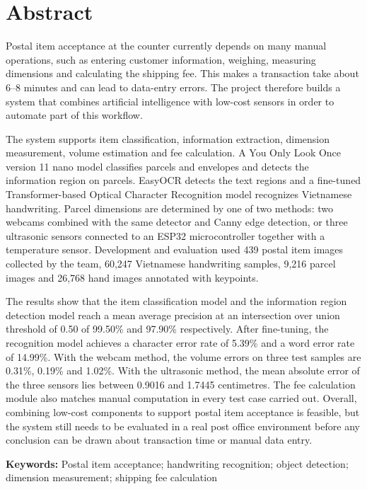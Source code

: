 \chapter*{Abstract}
\normalsize

Postal item acceptance at the counter currently depends on many manual operations, such as entering customer information, weighing, measuring dimensions and calculating the shipping fee. This makes a transaction take about 6--8 minutes and can lead to data-entry errors. The project therefore builds a system that combines artificial intelligence with low-cost sensors in order to automate part of this workflow.

The system supports item classification, information extraction, dimension measurement, volume estimation and fee calculation. A You Only Look Once version 11 nano model classifies parcels and envelopes and detects the information region on parcels. EasyOCR detects the text regions and a fine-tuned Transformer-based Optical Character Recognition model recognizes Vietnamese handwriting. Parcel dimensions are determined by one of two methods: two webcams combined with the same detector and Canny edge detection, or three ultrasonic sensors connected to an ESP32 microcontroller together with a temperature sensor. Development and evaluation used 439 postal item images collected by the team, 60,247 Vietnamese handwriting samples, 9,216 parcel images and 26,768 hand images annotated with keypoints.

The results show that the item classification model and the information region detection model reach a mean average precision at an intersection over union threshold of 0.50 of 99.50\% and 97.90\% respectively. After fine-tuning, the recognition model achieves a character error rate of 5.39\% and a word error rate of 14.99\%. With the webcam method, the volume errors on three test samples are 0.31\%, 0.19\% and 1.02\%. With the ultrasonic method, the mean absolute error of the three sensors lies between 0.9016 and 1.7445 centimetres. The fee calculation module also matches manual computation in every test case carried out. Overall, combining low-cost components to support postal item acceptance is feasible, but the system still needs to be evaluated in a real post office environment before any conclusion can be drawn about transaction time or manual data entry.

\vspace{0.5cm}
\noindent\textbf{Keywords:} Postal item acceptance; handwriting recognition; object detection; dimension measurement; shipping fee calculation
